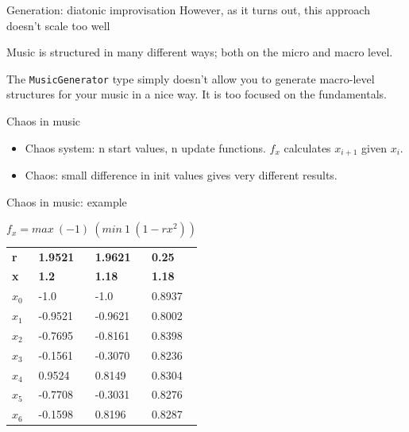 \documentclass{beamer}
\newcommand{\icode}[1]{\texttt{#1}}
\begin{document}
    \begin{frame}[fragile=singleslide]{Generation: diatonic improvisation}
    However, as it turns out, this approach doesn't scale too well

    Music is structured in many different ways; both on the micro and macro level.

    The \icode{MusicGenerator} type simply doesn't allow you to generate macro-level structures
    for your music in a nice way. It is too focused on the fundamentals.
	\end{frame}

        \begin{frame}{Chaos in music}
                    \begin{itemize}
                    \item Chaos system: n start values, n update functions. $f_x$ calculates $x_{i+1}$ given $x_{i}$.
                    \item Chaos: small difference in init values gives very different results.
                    \end{itemize}
        \end{frame}
                  
               \begin{frame}{Chaos in music: example}
          \begin{table}[]
                              \centering
                        \caption{$f_x = max\ (-1)\ (min\ 1\ (1 - rx^2))$}
                              \label{my-label}
                              \begin{tabular}{l | lll} %
                              \textbf{r} & \textbf{1.9521} & \textbf{1.9621} & \textbf{0.25} \\
                              \textbf{x} & \textbf{1.2}    & \textbf{1.18}   & \textbf{1.18} \\
                              \hline
                              $x_0$      & -1.0            & -1.0            & 0.8937        \\
                              $x_1$      & -0.9521         & -0.9621         & 0.8002        \\
                              $x_2$      & -0.7695         & -0.8161         & 0.8398        \\
                              $x_3$      & -0.1561         & -0.3070         & 0.8236        \\
                              $x_4$      & 0.9524          & 0.8149          & 0.8304        \\
                              $x_5$      & -0.7708         & -0.3031         & 0.8276        \\
                              $x_6$      & -0.1598         & 0.8196          & 0.8287       
                              \end{tabular}
                      \end{table}
        \end{frame}
        
\end{document}
